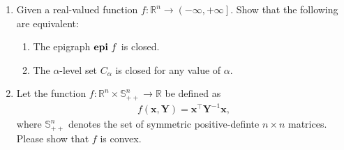 \documentclass[11pt,letter,notitlepage]{article}
\theoremstyle{definition}
\DeclareMathOperator*{\epi}{\bf epi\,}
\begin{document}
		\begin{exercise}
			\begin{enumerate}
				\item Given a real-valued function $f:\mathbb{R}^n \to \left( - \infty,+\infty \right]$. Show that the following are equivalent:
				\begin{enumerate}
					\item The epigraph $\epi f$ is closed.
					\item The $\alpha$-level set $C_{\alpha}$ is closed for any value of $\alpha$.
				\end{enumerate}
				\item Let the function $f:\mathbb{R}^n \times \mathbb{S}^n_{++} \rightarrow \mathbb{R}$ be defined as
				\begin{align*}
					f(\mathbf{x},\mathbf{Y}) = \mathbf{x}^{\top}\mathbf{Y}^{-1}\mathbf{x},
				\end{align*}
				where $\mathbb{S}^n_{++}$ denotes the set of symmetric positive-definte $n \times n$ matrices. Please show that $f$ is convex.
			\end{enumerate}
		\end{exercise}
		\begin{solution}
			
		\end{solution}
		\newpage
		
\end{document}

